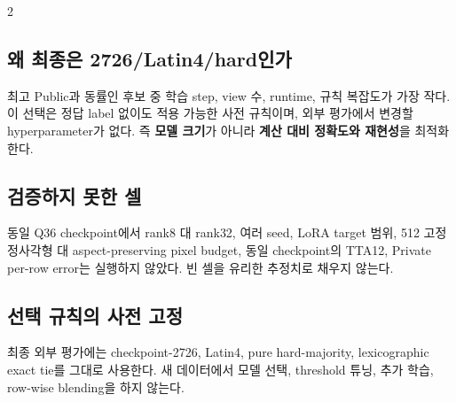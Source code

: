 \documentclass[9pt,a4paper]{extarticle}
\begin{document}
\begin{multicols}{2}
\subsection{왜 최종은 2726/Latin4/hard인가}

최고 Public과 동률인 후보 중 학습 step, view 수, runtime, 규칙 복잡도가 가장
작다. 이 선택은 정답 label 없이도 적용 가능한 사전 규칙이며, 외부 평가에서
변경할 hyperparameter가 없다. 즉 \textbf{모델 크기}가 아니라
\textbf{계산 대비 정확도와 재현성}을 최적화한다.

\subsection{검증하지 못한 셀}

동일 Q36 checkpoint에서 rank8 대 rank32, 여러 seed, LoRA target 범위,
512 고정 정사각형 대 aspect-preserving pixel budget, 동일 checkpoint의 TTA12,
Private per-row error는 실행하지 않았다. 빈 셀을 유리한 추정치로 채우지 않는다.

\subsection{선택 규칙의 사전 고정}

최종 외부 평가에는 checkpoint-2726, Latin4, pure hard-majority,
lexicographic exact tie를 그대로 사용한다. 새 데이터에서 모델 선택, threshold
튜닝, 추가 학습, row-wise blending을 하지 않는다.
\end{multicols}

\newpage
\end{document}
